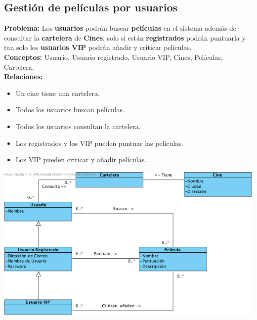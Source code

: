 \documentclass{article}
\begin{document}
	\subsection*{Gestión de películas por usuarios}
	\textbf{Problema:} Los \textbf{usuarios} podrán buscar \textbf{películas} en el sistema además de consultar la \textbf{cartelera} de \textbf{Cines}, solo si están \textbf{registrados} podrán puntuarla y tan solo los \textbf{usuarios VIP} podrán añadir y criticar películas.\\
	\textbf{Conceptos:} Usuario, Usuario registrado, Usuario VIP, Cines, Películas, Cartelera.\\
\textbf{	Relaciones:}
		\begin{itemize}
			\item Un cine tiene una cartelera.
			\item Todos los usuarios buscan películas.
			\item Todos los usuarios consultan la cartelera.
			\item Los registrados y los VIP pueden puntuar las películas.
			\item Los VIP pueden criticar y añadir películas.		
		\end{itemize}
			\includegraphics[width=1\linewidth]{./C-PeliculasUsuarios}
	
\end{document}
